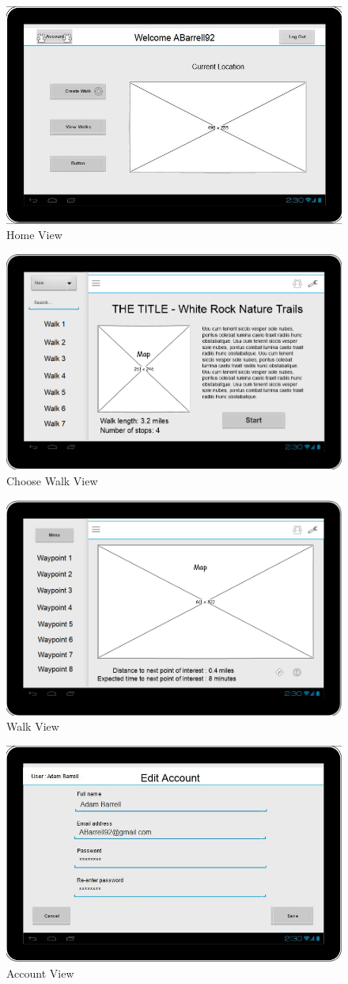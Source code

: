 \documentclass[11pt,a4paper]{article}
\begin{document}
\begin{appendices}
\begin{figure}[H]
\centering
\includegraphics[width=0.6\linewidth]{./img/proto1home}
\caption{Home View}
\end{figure}

\begin{figure}[H]
\centering
\includegraphics[width=0.6\linewidth]{./img/pencil_choose_walk}
\caption{Choose Walk View}
\end{figure}

\begin{figure}[H]
\centering
\includegraphics[width=0.6\linewidth]{./img/pencil_proto1}
\caption{Walk View}
\end{figure}

\begin{figure}[H]
\centering
\includegraphics[width=0.6\linewidth]{./img/proto1account}
\caption{Account View}
\end{figure}


\end{appendices}
\end{document}
